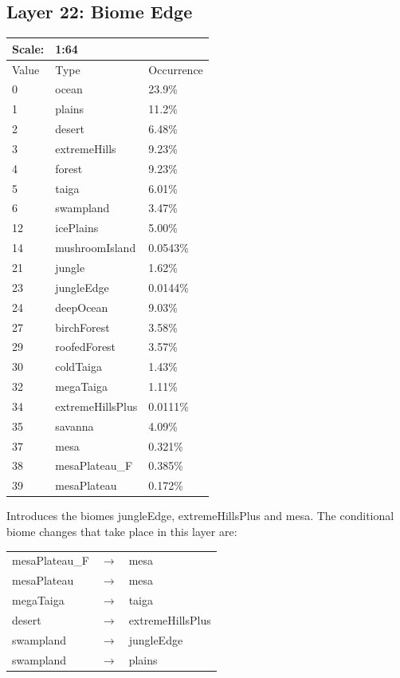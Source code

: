 \documentclass{article}
\begin{document}
	\subsection{Layer 22: Biome Edge}
	\begin{tabular}{|l|l|l|}\hline
		Scale: & \multicolumn{2}{|l|}{1:64} \\\hline\hline
		Value  & Type             & Occurrence \\\hline
		0      & ocean            & 23.9\%\\\hline
		1      & plains           & 11.2\%\\\hline
		2      & desert           & 6.48\%\\\hline
		3      & extremeHills     & 9.23\%\\\hline
		4      & forest           & 9.23\%\\\hline
		5      & taiga            & 6.01\%\\\hline
		6      & swampland        & 3.47\%\\\hline
		12     & icePlains        & 5.00\%\\\hline
		14     & mushroomIsland   & 0.0543\%\\\hline
		21     & jungle           & 1.62\%\\\hline
		23     & jungleEdge       & 0.0144\%\\\hline
		24     & deepOcean        & 9.03\%\\\hline
		27     & birchForest      & 3.58\%\\\hline
		29     & roofedForest     & 3.57\%\\\hline
		30     & coldTaiga        & 1.43\%\\\hline
		32     & megaTaiga        & 1.11\%\\\hline
		34     & extremeHillsPlus & 0.0111\%\\\hline
		35     & savanna          & 4.09\%\\\hline
		37     & mesa             & 0.321\%\\\hline
		38     & mesaPlateau\_F   & 0.385\%\\\hline
		39     & mesaPlateau      & 0.172\%\\\hline
	\end{tabular}

	\medskip\noindent
	Introduces the biomes jungleEdge, extremeHillsPlus and mesa. The conditional biome changes that take place in this layer are:

	\begin{tabular}{l c l}
		mesaPlateau\_F & $\longrightarrow$ & mesa\\
		mesaPlateau & $\longrightarrow$ & mesa\\
		megaTaiga & $\longrightarrow$ & taiga\\
		desert & $\longrightarrow$ & extremeHillsPlus\\
		swampland & $\longrightarrow$ & jungleEdge \\
		swampland & $\longrightarrow$ & plains
	\end{tabular}
\end{document}
